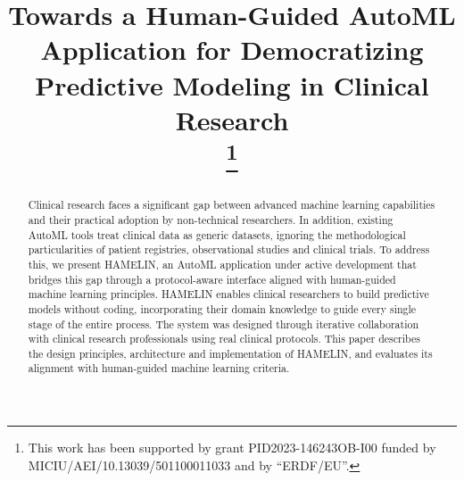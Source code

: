 \documentclass[conference,onecolumn]{IEEEtran}
\begin{document}
\title{Towards a Human-Guided AutoML Application for Democratizing Predictive Modeling in Clinical Research\\
\thanks{This work has been supported by grant  PID2023-146243OB-I00 funded by MICIU/AEI/10.13039/501100011033 and by ``ERDF/EU''.}
}

\author{
\and
{}
\and
{}
\and
{}
}

\maketitle

\begin{abstract}
Clinical research faces a significant gap between advanced machine learning capabilities and their practical adoption by non-technical researchers. In addition, existing AutoML tools treat clinical data as generic datasets, ignoring the methodological particularities of patient registries, observational studies and clinical trials. To address this, we present HAMELIN, an AutoML application under active development that bridges this gap through a protocol-aware interface aligned with human-guided machine learning principles. HAMELIN enables clinical researchers to build predictive models without coding, incorporating their domain knowledge to guide every single stage of the entire process. The system was designed through iterative collaboration with clinical research professionals using real clinical protocols. This paper describes the design principles, architecture and implementation of HAMELIN, and evaluates its alignment with human-guided machine learning criteria.
\end{abstract}
\end{document}
